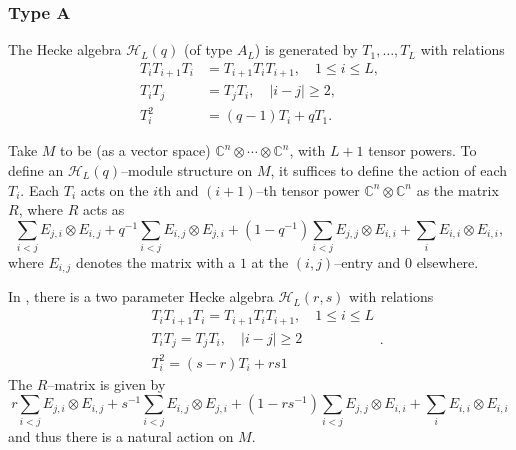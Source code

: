 \documentclass[12pt]{ximera}
\begin{document}

\subsubsection{Type A}
The Hecke algebra $\mathcal{H}_L(q)$ (of type $A_{L}$) is generated by $T_1,\ldots,T_{L}$ with relations
\begin{align*}
T_i T_{i+1} T_i &= T_{i+1}T_i T_{i+1}, \quad 1 \leq i \leq L,\\
T_i T_j &= T_j T_i, \quad \vert i-j\vert\geq 2,\\
T_i^2 &= (q-1)T_i + q T_1.
\end{align*}

Take $M$ to be (as a vector space) $\mathbb{C}^n \otimes \cdots \otimes \mathbb{C}^n$, with $L+1$ tensor powers. To define an $\mathcal{H}_L(q)$--module structure on $M$, it suffices to define the action of each $T_i$. Each $T_i$ acts on the $i$th and $(i+1)$--th tensor power $\mathbb{C}^n \otimes \mathbb{C}^n$ as the matrix $R$, where $R$ acts as
$$
\sum_{i<j} E_{j, i} \otimes E_{i, j}+q^{-1} \sum_{i<j} E_{i, j} \otimes E_{j, i}+\left(1- q^{-1}\right) \sum_{i<j} E_{j, j} \otimes E_{i, i}+\sum_{i} E_{i, i} \otimes E_{i, i},
$$
where $E_{i,j}$ denotes the matrix with a $1$ at the $(i,j)$--entry and $0$ elsewhere.

In \cite{BW}, there is a two parameter Hecke algebra $\mathcal{H}_L(r,s)$ with relations
$$
\begin{array}{l}\text { } T_{i} T_{i+1} T_{i}=T_{i+1} T_{i} T_{i+1}, \quad 1 \leq i\leq L \\ \text { } T_{i} T_{j}=T_{j} T_{i}, \quad|i-j| \geq 2 \\ \text {  } T_{i}^{2}=(s-r) T_{i}+r s 1\end{array}.
$$
The $R$--matrix is given by 
$$
r \sum_{i<j} E_{j, i} \otimes E_{i, j}+s^{-1} \sum_{i<j} E_{i, j} \otimes E_{j, i}+\left(1-r s^{-1}\right) \sum_{i<j} E_{j, j} \otimes E_{i, i}+\sum_{i} E_{i, i} \otimes E_{i, i}
$$
and thus there is a natural action on $M$.
\end{document}
